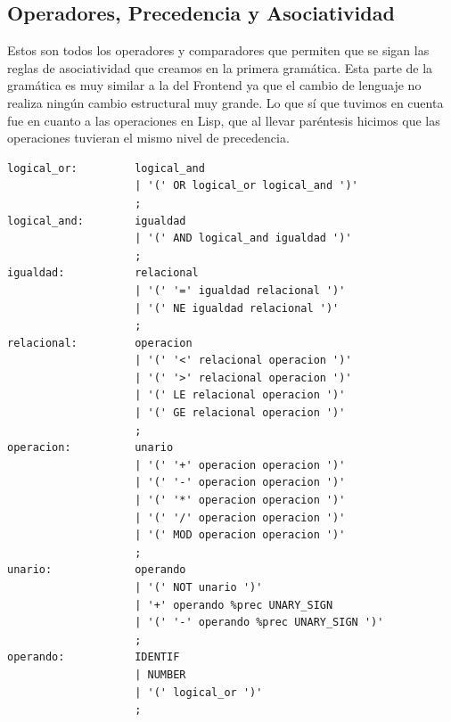 \documentclass[12pt,a4paper]{article}
\begin{document}
\subsection{Operadores, Precedencia y Asociatividad}
\noindent Estos son todos los operadores y comparadores que permiten que se sigan las reglas de 
asociatividad que creamos en la primera gramática. Esta parte de la gramática es muy similar a la 
del Frontend ya que el cambio de lenguaje no realiza ningún cambio estructural muy grande. Lo que sí
que tuvimos en cuenta fue en cuanto a las operaciones en Lisp, que al llevar paréntesis hicimos que las
operaciones tuvieran el mismo nivel de precedencia.
\begin{lstlisting}
logical_or:         logical_and                                                         
                    | '(' OR logical_or logical_and ')'      
                    ;                               
logical_and:        igualdad                                                            
                    | '(' AND logical_and igualdad ')'       
                    ;                               
igualdad:           relacional                                                          
                    | '(' '=' igualdad relacional ')'        
                    | '(' NE igualdad relacional ')'        
                    ;                               
relacional:         operacion                                                          
                    | '(' '<' relacional operacion ')'     
                    | '(' '>' relacional operacion ')'   
                    | '(' LE relacional operacion ')'   
                    | '(' GE relacional operacion ')'    
                    ;                               
operacion:          unario                                                              
                    | '(' '+' operacion operacion ')'    
                    | '(' '-' operacion operacion ')'  
                    | '(' '*' operacion operacion ')'  
                    | '(' '/' operacion operacion ')'  
                    | '(' MOD operacion operacion ')'  
                    ;                                                   
unario:             operando                                                            
                    | '(' NOT unario ')'                           
                    | '+' operando %prec UNARY_SIGN                                    
                    | '(' '-' operando %prec UNARY_SIGN ')'   
                    ;
operando:           IDENTIF
                    | NUMBER                                                            
                    | '(' logical_or ')'                                                
                    ;
\end{lstlisting}
\end{document}
